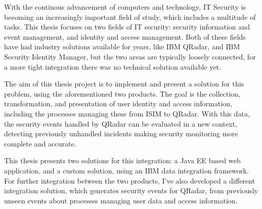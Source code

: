 With the continous advancement of computers and technology, IT Security is becoming an increasingly important field of study, which includes a multitude of tasks. This thesis focuses on two fields of IT security: security information and event management, and identity and access management. Both of these fields have had industry solutions available for years, like IBM QRadar, and IBM Security Identity Manager, but the two areas are typically loosely connected, for a more tight integration there was no technical solution available yet.

The aim of this thesis project is to implement and present a solution for this problem, using the aforementioned two products. The goal is the collection, transformation, and presentation of user identity and access information, including the processes managing these from ISIM to QRadar. With this data, the security events handled by QRadar can be evaluated in a new context, detecting previously unhandled incidents making security monitoring more complete and accurate.

This thesis presents two solutions for this integration: a Java EE based web application, and a custom solution, using an IBM data integration framework. For further integration between the two products, I've also developed a different integration solution, which generates security events for QRadar, from previously unseen events about processes managing user data and access information.


\vfill
\selectthesislanguage

\setcounter{romanPage}{\value{page}}
